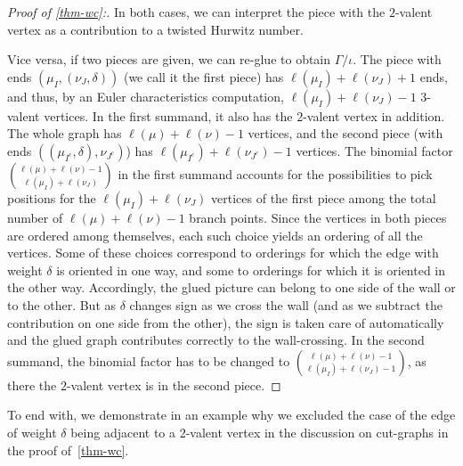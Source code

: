 \documentclass[ALCO,published]{cedram}
\begin{document}
\begin{proof}[Proof of \cref{thm-wc}:]
In both cases, we can interpret the piece with the $2$-valent vertex as a contribution to a twisted Hurwitz number.

Vice versa, if two pieces are given, we can re-glue to obtain $\Gamma/\iota$. 
The piece with ends $(\mu_I,(\nu_J,\delta))$ (we call it the first piece) has $\ell(\mu_I)+\ell(\nu_J)+1$ ends, and thus, by an Euler characteristics computation, $\ell(\mu_I)+\ell(\nu_J)-1$ $3$-valent vertices. In the first summand, it also has the $2$-valent vertex in addition.
The whole graph has $\ell(\mu)+\ell(\nu)-1$ vertices, and the second piece (with ends  $((\mu_{I^c},\delta),\nu_{J^c})$)
has $\ell(\mu_{I^c})+\ell(\nu_{J^c})-1$ vertices. 
The binomial factor $\binom{\ell(\mu)+\ell(\nu)-1}{\ell(\mu_I)+\ell(\nu_J)}$ in the first summand accounts for the possibilities to pick positions for the $\ell(\mu_I)+\ell(\nu_J)$ vertices of the first piece among the total number of $\ell(\mu)+\ell(\nu)-1$ branch points. Since the vertices in both pieces are ordered among themselves, each such choice yields an ordering of all the vertices. Some of these choices correspond to orderings for which the edge with weight $\delta$ is oriented in one way, and some to orderings for which it is oriented in the other way. Accordingly, the glued picture can belong to one side of the wall or to the other. But as $\delta$ changes sign as we cross the wall (and as we subtract the contribution on one side from the other), the sign is taken care of automatically and the glued graph contributes correctly to the wall-crossing.
In the second summand, the binomial factor has to be changed to $\binom{\ell(\mu)+\ell(\nu)-1}{\ell(\mu_I)+\ell(\nu_J)-1}$, as there the $2$-valent vertex is in the second piece.
\end{proof}

To end with, we demonstrate in an example why we excluded the case of the edge of weight $\delta$ being adjacent to a $2$-valent vertex in the discussion on cut-graphs in the proof of~\cref{thm-wc}.
\end{document}
